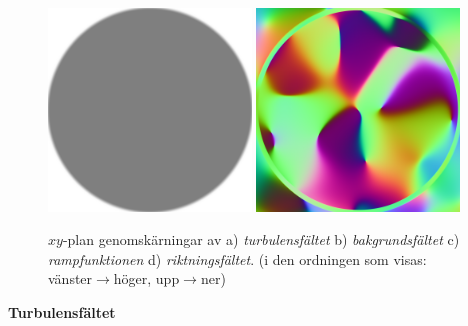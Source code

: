 \documentclass[a4paper]{article}
\begin{document}
\begin{multicols}{2}
\begin{figure}[H]
\begin{minipage}[]{0.5\textwidth}
\includegraphics[width=0.48\textwidth]{share/Alpha_downscale.png}
\includegraphics[width=0.48\textwidth]{share/Curl_downscale.png}
\end{minipage}
    \caption{$xy$-plan genomskärningar av  a) \emph{turbulensfältet} b) \emph{bakgrundsfältet} c) \emph{rampfunktionen} d) \emph{riktningsfältet}. (i den ordningen som visas: vänster$\rightarrow$höger, upp$\rightarrow$ner)}
\label{fig:curlnoise}
\end{figure}

\vspace{-0.3cm}
    \textbf{Turbulensfältet}


\end{multicols}
\end{document}
